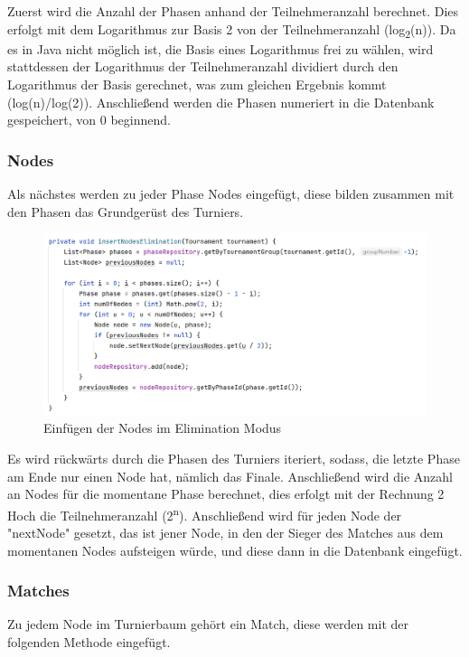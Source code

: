 Zuerst wird die Anzahl der Phasen anhand der Teilnehmeranzahl berechnet. Dies erfolgt mit dem Logarithmus zur Basis 2 von der Teilnehmeranzahl (log\textsubscript{2}(n)). 
Da es in Java nicht möglich ist, die Basis eines Logarithmus frei zu wählen, wird stattdessen der Logarithmus der Teilnehmeranzahl dividiert durch den 
Logarithmus der Basis gerechnet, was zum gleichen Ergebnis kommt (log(n)/log(2)). Anschließend werden die Phasen numeriert in die Datenbank gespeichert, von 0 beginnend.

\subsubsection{Nodes}

Als nächstes werden zu jeder Phase Nodes eingefügt, diese bilden zusammen mit den Phasen das Grundgerüst des Turniers. 

\begin{figure}[H]
    \includegraphics[scale=0.48]{pics/backend/elimination/elimination_insertNodes.png}
    \caption{Einfügen der Nodes im Elimination Modus}
\end{figure}

Es wird rückwärts durch die Phasen des Turniers iteriert, sodass, die letzte Phase am Ende nur einen Node hat, nämlich das Finale.
Anschließend wird die Anzahl an Nodes für die momentane Phase berechnet, dies erfolgt mit der Rechnung 2 Hoch die Teilnehmeranzahl (2\textsuperscript{n}). 
Anschließend wird für jeden Node der "nextNode" gesetzt, das ist jener Node, in den der Sieger des Matches aus dem momentanen Nodes aufsteigen würde, 
und diese dann in die Datenbank eingefügt.

\subsubsection{Matches}

Zu jedem Node im Turnierbaum gehört ein Match, diese werden mit der folgenden Methode eingefügt.

